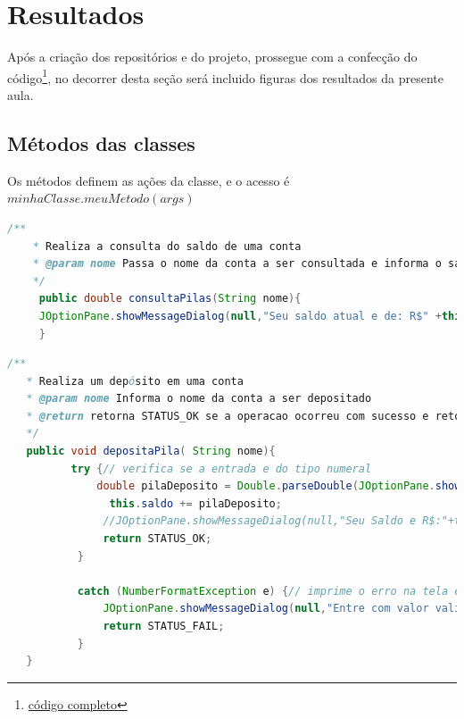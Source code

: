 \section{Resultados}

\par Após a criação dos repositórios e do projeto, prossegue com a confecção do código\footnote{\hyperref[anexo]{código completo}}, no decorrer desta seção será incluido figuras dos resultados da presente aula.




\subsection{Métodos das classes}

\par Os métodos definem as ações da classe, e o acesso é $minhaClasse.meuMetodo(args)$

\begin{lstlisting}[language=Java, caption=consultaPilas, label=consultaPilas]
    /**
    * Realiza a consulta do saldo de uma conta
    * @param nome Passa o nome da conta a ser consultada e informa o saldo ao cliente.
    */
     public double consultaPilas(String nome){
     JOptionPane.showMessageDialog(null,"Seu saldo atual e de: R$" +this.saldo, this.nome+" "+this.sobrenome, JOptionPane.INFORMATION_MESSAGE, icon);
     }
\end{lstlisting}



\begin{lstlisting}[language=Java, caption=depositoPilas, label=depositaPilas]
  /**
   * Realiza um depósito em uma conta
   * @param nome Informa o nome da conta a ser depositado
   * @return retorna STATUS_OK se a operacao ocorreu com sucesso e retorna STATUS_FAIL se ocorrer um erro
   */
   public void depositaPila( String nome){
          try {// verifica se a entrada e do tipo numeral
              double pilaDeposito = Double.parseDouble(JOptionPane.showInputDialog(null,"Informe a quantidade em Reais (R$) a ser depositado na conta do "+this.nome+" "+this.sobrenome));
                this.saldo += pilaDeposito;
               //JOptionPane.showMessageDialog(null,"Seu Saldo e R$:"+this.consultaPilas(this.nome)+" Reais", this.nome, JOptionPane.INFORMATION_MESSAGE, icon);
               return STATUS_OK;
           }

           catch (NumberFormatException e) {// imprime o erro na tela e informa o que foi digitado.
               JOptionPane.showMessageDialog(null,"Entre com valor valido, do tipo numeral.\n Use (.) ponto em vez de (,) virgula\n ERRO: " + e.getMessage()  , "ERRO", JOptionPane.ERROR_MESSAGE);
               return STATUS_FAIL;
           }
   }
\end{lstlisting}




